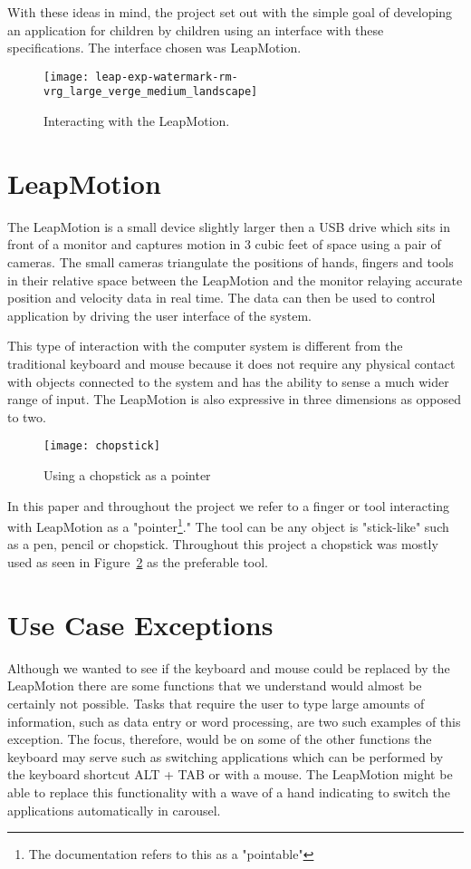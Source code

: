 With these ideas in mind, the project set out with the simple goal of developing an application for children by children using an interface with these specifications. The interface chosen was LeapMotion.


\begin{figure}
\centering

\texttt{[image: leap-exp-watermark-rm-vrg\_large\_verge\_medium\_landscape]}
\caption{Interacting with the LeapMotion. \cite{theverge} }
\label{fig:leapmotionpicture}
\end{figure}

\section{LeapMotion}

The LeapMotion is a small device slightly larger then a USB drive which sits in front of a monitor and captures motion in 3 cubic feet of space using a pair of cameras. The small cameras triangulate the positions of hands, fingers and tools in their relative space between the LeapMotion and the monitor relaying accurate position and velocity data in real time. The data can then be used to control application by driving the user interface of the system. \cite{leapmotion} 

This type of interaction with the computer system is different from the traditional keyboard and mouse because it does not require any physical contact with objects connected to the system and has the ability to sense a much wider range of input. The LeapMotion is also expressive in three dimensions as opposed to two.

\begin{figure}
\centering

\texttt{[image: chopstick]}
\caption{Using a chopstick as a pointer}
\label{fig:chopstick}
\end{figure}
In this paper and throughout the project we refer to a finger or tool interacting with LeapMotion as a "pointer\footnote{The documentation refers to this as a "pointable"}." The tool can be any object is "stick-like" such as a pen, pencil or chopstick. Throughout this project a chopstick was mostly used as seen in Figure~\ref{fig:chopstick} as the preferable tool.

\section{Use Case Exceptions}
Although we wanted to see if the keyboard and mouse could be replaced by the LeapMotion there are some functions that we understand would almost be certainly not possible. Tasks that require the user to type large amounts of information, such as data entry or word processing, are two such examples of this exception. The focus, therefore, would be on some of the other functions the keyboard may serve such as switching applications which can be performed by the keyboard shortcut ALT + TAB or with a mouse. The LeapMotion might be able to replace this functionality with a wave of a hand indicating to switch the applications automatically in carousel. 

